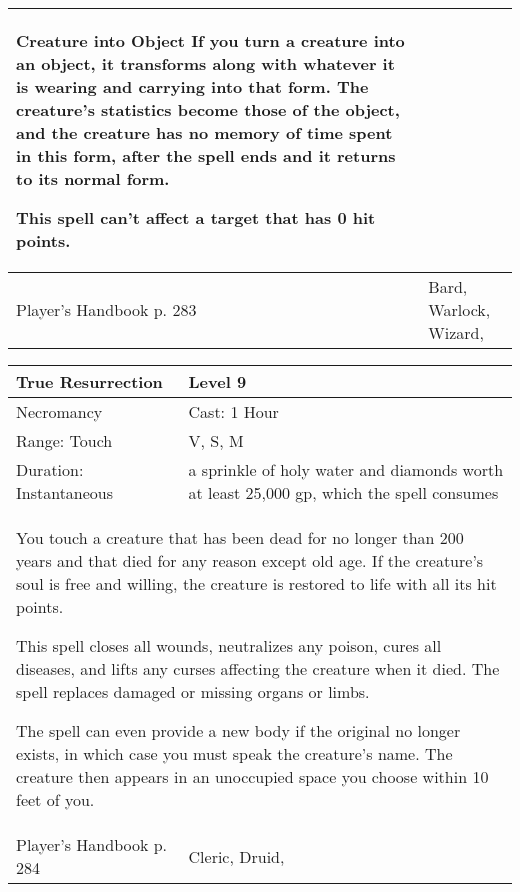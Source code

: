 \documentclass[11pt]{report}
\begin{document}
\begin{table}[H]
\begin{tabular}{||p{6cm}|p{6cm}||}
{Creature into Object
If you turn a creature into an object, it transforms along with whatever it is wearing and carrying into that form. The creature’s statistics become those of the object, and the creature has no memory of time spent in this form, after the spell ends and it returns to its normal form.

This spell can’t affect a target that has 0 hit points.}\\ \hline
Player's Handbook p. 283 & Bard, Warlock, Wizard, \\ \hline\hline
	\end{tabular}
\end{table}

\begin{table}[H]
	\begin{tabular}{||p{6cm}|p{6cm}||}
		\hline\hline
		\bf{True Resurrection} & Level 9\\ \hline
		Necromancy & Cast: 1 Hour\\ \hline
		Range: Touch & V, S, M\\ \hline
		Duration: Instantaneous & a sprinkle of holy water and diamonds worth at least 25,000 gp, which the spell consumes\\ \hline
		\multicolumn{2}{||p{12cm}||}{You touch a creature that has been dead for no longer than 200 years and that died for any reason except old age. If the creature’s soul is free and willing, the creature is restored to life with all its hit points.

This spell closes all wounds, neutralizes any poison, cures all diseases, and lifts any curses affecting the creature when it died. The spell replaces damaged or missing organs or limbs.

The spell can even provide a new body if the original no longer exists, in which case you must speak the creature’s name. The creature then appears in an unoccupied space you choose within 10 feet of you.}\\ \hline
Player's Handbook p. 284 & Cleric, Druid, \\ \hline\hline
	\end{tabular}
\end{table}
\end{document}
